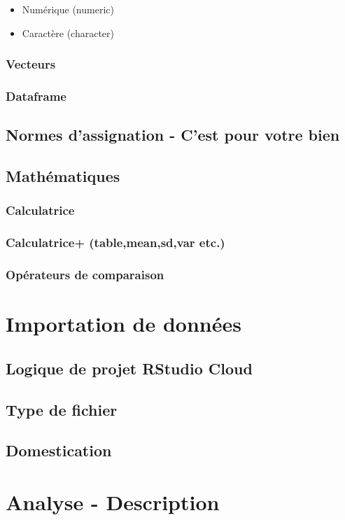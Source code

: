 \documentclass[10.5pt,a4paper]{article}
\begin{document}
    \begin{itemize}
    \item Numérique (numeric)
    \item Caractère (character) 
    \end{itemize}
    
    \subsubsection{Vecteurs}
    \subsubsection{Dataframe}
  \subsection{Normes d'assignation - C'est pour votre bien}
  \subsection{Mathématiques}
    \subsubsection{Calculatrice}
    \subsubsection{Calculatrice+ (table,mean,sd,var etc.)}
    \subsubsection{Opérateurs de comparaison}

  
\section{Importation de données}
  \subsection{Logique de projet RStudio Cloud}
  \subsection{Type de fichier}
  \subsection{Domestication}

  
\section{Analyse - Description}
\end{document}
